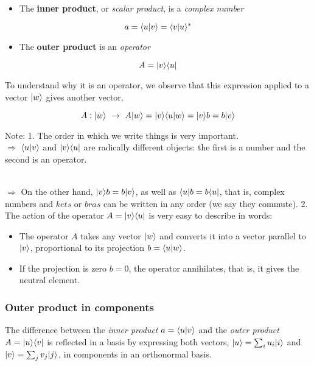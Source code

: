 \documentclass[11pt]{article}
\providecommand{\tightlist}{%
      \setlength{\itemsep}{0pt}\setlength{\parskip}{0pt}}
\begin{document}
\begin{itemize}
\tightlist
\item
  The \textbf{inner product}, or \emph{scalar product}, is a
  \emph{complex number}
\end{itemize}

\[
 a = \langle u|v\rangle = \langle v|u\rangle^* 
\]

\begin{itemize}
\tightlist
\item
  The \textbf{outer product} is an \emph{operator}
\end{itemize}

\[
A = | v\rangle \langle u|
\]

    To understand why it is an operator, we observe that this expression
applied to a vector \(|w\rangle\) gives another vector,

\[
A : |w\rangle ~\to ~ A|w\rangle =  |v\rangle\langle u|w\rangle = |v\rangle b = b |v\rangle 
\]

    Note: 1. The order in which we write things is very important. \\
\(\Rightarrow\) \(\langle u|v\rangle\) and \(| v\rangle \langle u|\) are radically
different objects: the first is a number and the second is an operator.
\\
\strut \\
\(\Rightarrow\) On the other hand, \(|v\rangle b = b |v\rangle\), as well as
\(\langle u| b = b \langle u|\), that is, complex numbers and \(kets\) or
\(bras\) can be written in any order (we say they commute). 2. The
action of the operator \(A = |v\rangle\langle u|\) is very easy to describe
in words:

\begin{itemize}
\tightlist
\item
  The operator \(A\) takes any vector \(|w\rangle\) and converts it into a
  vector parallel to \(|v\rangle\), proportional to its projection
  \(b = \langle u|w\rangle\). \\
\item
  If the projection is zero \(b=0\), the operator annihilates, that is,
  it gives the neutral element.
\end{itemize}

    \subsubsection{Outer product in
components}\label{outer-product-in-components}

The difference between the \emph{inner product} \(a = \langle u|v\rangle\)
and the \emph{outer product} \(A = | u\rangle \langle v|\) is reflected in a
basis by expressing both vectors, \(|u\rangle = \sum_i u_i |i\rangle\) and
\(|v\rangle = \sum_j v_j |j\rangle\), in components in an orthonormal basis.
\end{document}
